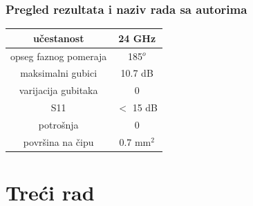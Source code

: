 \documentclass{beamer}
\begin{document}
\begin{frame}
\frametitle{Pregled rezultata i naziv rada sa autorima}
\begin{center}
\begin{tabular}{ | c | c | }
  \hline
  učestanost & 24 GHz \\
  \hline 
  opseg faznog pomeraja & 185$^o$ \\  
  \hline
  maksimalni gubici & 10.7 dB \\
  \hline
  varijacija gubitaka & 0 \\
  \hline
  S11 & $<$ 15 dB \\
  \hline
  potrošnja & 0 \\
  \hline
  površina na čipu & 0.7 mm$^2$  \\  
  \hline
\end{tabular}
\end{center}
\end{frame}

\section{Treći rad}

\begin{frame}

\end{frame}

  
\end{document}
